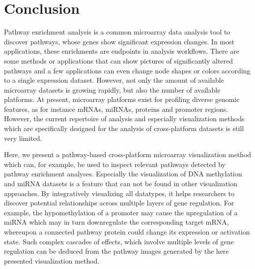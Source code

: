 \documentclass{bioinfo}
\begin{document}
\section{Conclusion}

Pathway enrichment analysis is a common microarray data analysis tool to discover pathways, whose
genes show significant expression changes. In most applications, these enrichments are endpoints in
analysis workflows. There are some methods or applications that can show pictures of significantly
altered pathways and a few applications can even change node shapes or colors according to a single
expression dataset. However, not only the amount of available microarray datasets is growing
rapidly, but also the number of available platforms. At present, microarray platforms exist for
profiling diverse genomic features, as for instance mRNAs, miRNAs, proteins and promoter regions.
However, the current repertoire of analysis and especially visualization methods which are specifically designed for
the analysis of cross-platform datasets is still very limited.

Here, we present a pathway-based cross-platform microarray visualization method which
can, for example, be used to inspect relevant pathways detected by pathway enrichment analyses. Especially the
visualization of DNA methylation and miRNA datasets is a feature that can not be found in other
visualization approaches. By integratively visualizing all datatypes, it helps researchers to
discover potential relationships across multiple layers of gene regulation.
For example, the hypomethylation of a promoter may cause the upregulation of a miRNA which may in turn
downregulate the corresponding target mRNA, whereupon a connected pathway protein could change its expression or activation state.
Such complex cascades of effects, which involve multiple levels of gene regulation can be deduced from the pathway images
generated by the here presented visualization method.

\end{document}
